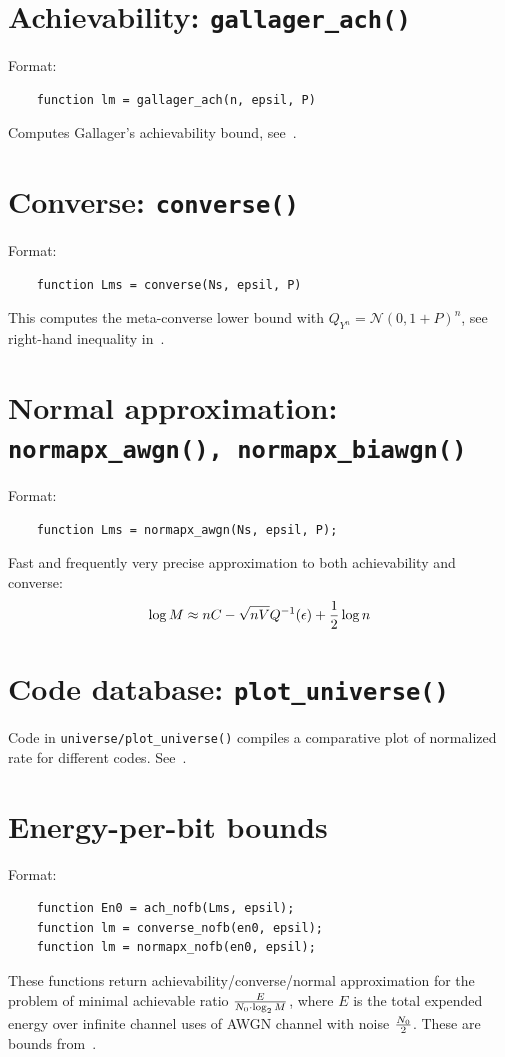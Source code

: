 \documentclass[a4paper,11p]{memoir}
\def\matn{\mathcal{N}}
\begin{document}
\section{Achievability: \texttt{gallager\_ach()}}
Format:
\begin{verbatim}
	function lm = gallager_ach(n, epsil, P)
\end{verbatim}

Computes Gallager's achievability bound, see~\cite[(44)]{PPV08}.

\section{Converse: \texttt{converse()}}
Format:
\begin{verbatim}
	function Lms = converse(Ns, epsil, P)
\end{verbatim}

This computes the meta-converse lower bound with $Q_{Y^n} = \matn(0, 1+P)^n$, see right-hand inequality in~\cite[(218)]{PPV08}. 


\section{Normal approximation: \texttt{normapx\_awgn(), normapx\_biawgn()}}

Format:
\begin{verbatim}
	function Lms = normapx_awgn(Ns, epsil, P);
\end{verbatim}

Fast and frequently very precise approximation to both achievability and converse:
	$$ \log M \approx n C - \sqrt{nV} Q^{-1}(\epsilon) + {1\over2} \log n $$


\section{Code database: \texttt{plot\_universe()}}

Code in \verb|universe/plot_universe()| compiles a comparative plot of normalized rate for different codes.
See~\cite[Section IV.D]{PPV08}.


\section{Energy-per-bit bounds}

Format:
\begin{verbatim}
	function En0 = ach_nofb(Lms, epsil);
	function lm = converse_nofb(en0, epsil);
	function lm = normapx_nofb(en0, epsil);
\end{verbatim}

These functions return achievability/converse/normal approximation for the problem of minimal achievable ratio ${E\over
N_0 \cdot \log_2 M}$, where $E$ is the total expended energy over infinite channel uses of AWGN channel with noise
$N_0\over 2$.  These are bounds from~\cite[Theorems 2 and 3]{PPV10eneff}.



\end{document}
